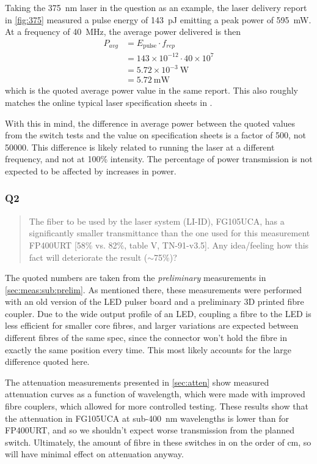 \documentclass[a4paper,11pt]{article}
\let\oldsim\sim
\renewcommand{\sim}{{\oldsim}}
\begin{document}
Taking the 375~nm laser in the question as an example, the laser delivery report in \cref{fig:375} measured a pulse energy of 143~pJ emitting a peak power of 595~mW. At a frequency of 40~MHz, the average power delivered is then
\begin{align*}
    P_{avg} &= E_\text{pulse} \cdot f_{rep} \\
            &= 143\times10^{-12} \cdot 40\times10^7 \\
            &= 5.72\times10^{-3}~\text{W} \\
            &= 5.72~\text{mW}
\end{align*}
which is the quoted average power value in the same report. This also roughly matches the online typical laser specification sheets in \cite{bib:laserhead}.

With this in mind, the difference in average power between the quoted values from the switch tests and the value on specification sheets is a factor of 500, not 50000. This difference is likely related to running the laser at a different frequency, and not at 100\% intensity. The percentage of power transmission is not expected to be affected by increases in power.

\subsubsection{Q2}
\begin{quote}
The fiber to be used by the laser system (LI-ID), FG105UCA, has a significantly smaller transmittance than the one used for this measurement FP400URT [58\% vs. 82\%, table V, TN-91-v3.5]. Any idea/feeling how this fact will deteriorate the result ($\sim$75\%)?
\end{quote}

The quoted numbers are taken from the {\it preliminary} measurements in \cref{sec:meas:sub:prelim}. As mentioned there, these measurements were performed with an old version of the LED pulser board and a preliminary 3D printed fibre coupler. Due to the wide output profile of an LED, coupling a fibre to the LED is less efficient for smaller core fibres, and larger variations are expected between different fibres of the same spec, since the connector won't hold the fibre in exactly the same position every time. This most likely accounts for the large difference quoted here.

The attenuation measurements presented in \cref{sec:atten} show measured attenuation curves as a function of wavelength, which were made with improved fibre couplers, which allowed for more controlled testing. These results show that the attenuation in FG105UCA at sub-400~nm wavelengths is lower than for FP400URT, and so we shouldn't expect worse transmission from the planned switch. Ultimately, the amount of fibre in these switches in on the order of cm, so will have minimal effect on attenuation anyway.
\end{document}
